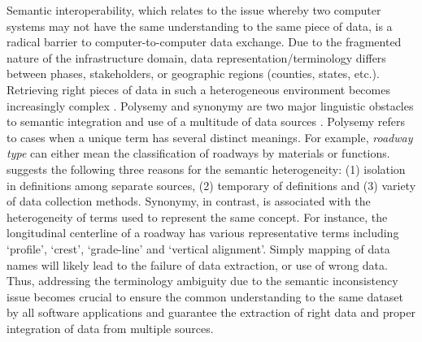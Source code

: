 \documentclass[Journal,InsideFigs, DoubleSpace]{ascelike} %
\begin{document}
Semantic interoperability, which relates to the issue whereby two computer systems may not have the same understanding to the same piece of data, is a radical barrier to computer-to-computer data exchange. Due to the fragmented nature of the infrastructure domain, data representation/terminology differs between phases, stakeholders, or geographic regions (counties, states, etc.). Retrieving right pieces of data in such a heterogeneous environment becomes increasingly complex \cite{karimi2003semantic}. Polysemy and synonymy are two major linguistic obstacles to semantic integration and use of a multitude of data sources \cite{noy04}. Polysemy refers to cases when a unique term has several distinct meanings. For example, \textit{roadway type} can either mean the classification of roadways by materials or functions.  suggests the following three reasons for the semantic heterogeneity: (1) isolation in definitions among separate sources, (2) temporary of definitions and (3) variety of data collection methods. Synonymy, in contrast, is associated with the heterogeneity of terms used to represent the same concept. For instance, the longitudinal centerline of a roadway has various representative terms including `profile', `crest', `grade-line' and `vertical alignment'. Simply mapping of data names will likely lead to the failure of data extraction, or use of wrong data. Thus, addressing the terminology ambiguity due to the semantic inconsistency issue becomes crucial to ensure the common understanding to the same dataset by all software applications and guarantee the extraction of right data and proper integration of data from multiple sources. 
\par
%
\end{document}
